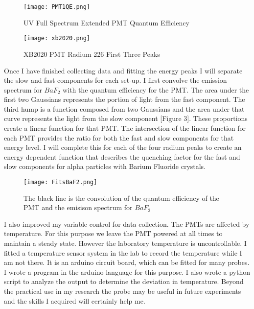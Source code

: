 \documentclass{article}
\begin{document}
\begin{figure}[H]
  \centering
  \begin{minipage}[b]{0.4\textwidth}
    \texttt{[image: PMT1QE.png]}
    \caption{UV Full Spectrum Extended PMT Quantum Efficiency}
  \end{minipage}
  \hfill
  \begin{minipage}[b]{0.4\textwidth}
    \texttt{[image: xb2020.png]}
    \caption{XB2020 PMT Radium 226 First Three Peaks}
  \end{minipage}
\end{figure}


Once I have finished collecting data and fitting the energy peaks I will separate the slow and fast components for each set-up. I first convolve the emission spectrum for $BaF_2$ with the quantum efficiency for the PMT. The area under the first two Gaussians represents the portion of light from the fast component. The third hump is a function composed from two Gaussians and the area under that curve represents the light from the slow component [Figure 3]. These proportions create a linear function for that PMT. The intersection of the linear function for each PMT provides the ratio for both the fast and slow components for that energy level. I will complete this for each of the four radium peaks to create an energy dependent function that describes the quenching factor for the fast and slow components for alpha particles with Barium Fluoride crystals.

\begin{figure}[H]
  \centering
  \begin{minipage}[b]{0.4\textwidth}
    \texttt{[image: FitsBaF2.png]}
    \caption{The black line is the convolution of the quantum efficiency of the PMT and the emisison spectrum for $BaF_2$ }
  \end{minipage}
\end{figure}

I also improved my variable control for data collection. The PMTs are affected by temperature. For this purpose we leave the PMT powered at all times to maintain a steady state. However the laboratory temperature is uncontrollable. I fitted a temperature sensor system in the lab to record the temperature while I am not there. It is an arduino circuit board, which can be fitted for many probes. I wrote a program in the arduino language for this purpose. I also wrote a python script to analyze the output to determine the deviation in temperature. Beyond the practical use in my research the probe may be useful in future experiments and the skills I acquired will certainly help me. 
\end{document}
